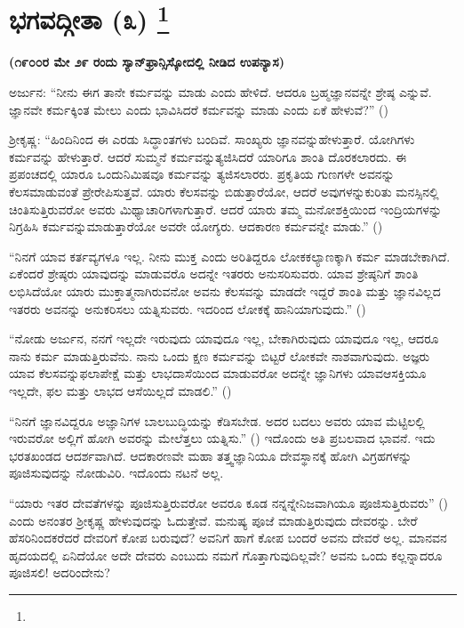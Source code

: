 
\chapter[ಭಗವದ್ಗೀತಾ (೩) ]{ಭಗವದ್ಗೀತಾ (೩) \protect\footnote{}}

\centerline{\textbf{(೧೯೦೦ರ ಮೇ ೨೯ ರಂದು ಸ್ಯಾನ್​ಫ್ರಾನ್ಸಿಸ್ಕೋದಲ್ಲಿ ನೀಡಿದ ಉಪನ್ಯಾಸ)}}

ಅರ್ಜುನ: “ನೀನು ಈಗ ತಾನೇ ಕರ್ಮವನ್ನು ಮಾಡು ಎಂದು ಹೇಳಿದೆ. ಆದರೂ ಬ್ರಹ್ಮಜ್ಞಾನವನ್ನೇ ಶ್ರೇಷ್ಠ ಎನ್ನುವೆ. ಜ್ಞಾನವೇ ಕರ್ಮಕ್ಕಿಂತ ಮೇಲು ಎಂದು ಭಾವಿಸಿದರೆ ಕರ್ಮವನ್ನು ಮಾಡು ಎಂದು ಏಕೆ ಹೇಳುವೆ?” ()

ಶ‍್ರೀಕೃಷ್ಣ: “ಹಿಂದಿನಿಂದ ಈ ಎರಡು ಸಿದ್ಧಾಂತಗಳು ಬಂದಿವೆ. ಸಾಂಖ್ಯರು ಜ್ಞಾನವನ್ನು\break ಹೇಳುತ್ತಾರೆ. ಯೋಗಿಗಳು ಕರ್ಮವನ್ನು ಹೇಳುತ್ತಾರೆ. ಆದರೆ ಸುಮ್ಮನೆ ಕರ್ಮವನ್ನು\break ತ್ಯಜಿಸಿದರೆ ಯಾರಿಗೂ ಶಾಂತಿ ದೊರಕಲಾರದು. ಈ ಪ್ರಪಂಚದಲ್ಲಿ ಯಾರೂ ಒಂದು\break ನಿಮಿಷವೂ ಕರ್ಮವನ್ನು ತ್ಯಜಿಸಲಾರರು. ಪ್ರಕೃತಿಯ ಗುಣಗಳೇ ಅವನನ್ನು ಕೆಲಸ\break ಮಾಡುವಂತೆ ಪ್ರೇರೇಪಿಸುತ್ತವೆ. ಯಾರು ಕೆಲಸವನ್ನು ಬಿಡುತ್ತಾರೆಯೋ, ಆದರೆ ಅವುಗಳನ್ನು\break ಕುರಿತು ಮನಸ್ಸಿನಲ್ಲಿ ಚಿಂತಿಸುತ್ತಿರುವರೋ ಅವರು ಮಿಥ್ಯಾಚಾರಿಗಳಾಗುತ್ತಾರೆ. ಆದರೆ ಯಾರು ತಮ್ಮ ಮನೋಶಕ್ತಿಯಿಂದ ಇಂದ್ರಿಯಗಳನ್ನು ನಿಗ್ರಹಿಸಿ ಕರ್ಮವನ್ನು\break ಮಾಡುತ್ತಾರೆಯೋ ಅವರೇ ಯೋಗ್ಯರು. ಆದಕಾರಣ ಕರ್ಮವನ್ನೇ ಮಾಡು.” ()

“ನಿನಗೆ ಯಾವ ಕರ್ತವ್ಯಗಳೂ ಇಲ್ಲ. ನೀನು ಮುಕ್ತ ಎಂದು ಅರಿತಿದ್ದರೂ ಲೋಕಕಲ್ಯಾಣಕ್ಕಾಗಿ ಕರ್ಮ ಮಾಡಬೇಕಾಗಿದೆ. ಏಕೆಂದರೆ ಶ್ರೇಷ್ಠರು ಯಾವುದನ್ನು ಮಾಡುವರೊ ಅದನ್ನೇ ಇತರರು ಅನುಸರಿಸುವರು. ಯಾವ ಶ್ರೇಷ್ಠನಿಗೆ ಶಾಂತಿ ಲಭಿಸಿದೆಯೋ ಯಾರು ಮುಕ್ತಾತ್ಮನಾಗಿರುವನೋ ಅವನು ಕೆಲಸವನ್ನು ಮಾಡದೇ ಇದ್ದರೆ ಶಾಂತಿ ಮತ್ತು ಜ್ಞಾನವಿಲ್ಲದ ಇತರರು ಅವನನ್ನು ಅನುಕರಿಸಲು ಯತ್ನಿಸುವರು. ಇದರಿಂದ ಲೋಕಕ್ಕೆ ಹಾನಿಯಾಗುವುದು.” ()

“ನೋಡು ಅರ್ಜುನ, ನನಗೆ ಇಲ್ಲದೇ ಇರುವುದು ಯಾವುದೂ ಇಲ್ಲ, ಬೇಕಾಗಿರುವುದು ಯಾವುದೂ ಇಲ್ಲ, ಆದರೂ ನಾನು ಕರ್ಮ ಮಾಡುತ್ತಿರುವೆನು. ನಾನು ಒಂದು ಕ್ಷಣ ಕರ್ಮವನ್ನು ಬಿಟ್ಟರೆ ಲೋಕವೇ ನಾಶವಾಗುವುದು. ಅಜ್ಞರು ಯಾವ ಕೆಲಸವನ್ನು\break ಫಲಾಪೇಕ್ಷೆ ಮತ್ತು ಲಾಭದಾಸೆಯಿಂದ ಮಾಡುವರೋ ಅದನ್ನೇ ಜ್ಞಾನಿಗಳು ಯಾವ\break ಆಸಕ್ತಿಯೂ ಇಲ್ಲದೇ, ಫಲ ಮತ್ತು ಲಾಭದ ಆಸೆಯಿಲ್ಲದೆ ಮಾಡಲಿ.” ()

“ನಿನಗೆ ಜ್ಞಾನವಿದ್ದರೂ ಅಜ್ಞಾನಿಗಳ ಬಾಲಬುದ್ಧಿಯನ್ನು ಕೆಡಿಸಬೇಡ. ಅದರ ಬದಲು ಅವರು ಯಾವ ಮೆಟ್ಟಿಲಲ್ಲಿ ಇರುವರೋ ಅಲ್ಲಿಗೆ ಹೋಗಿ ಅವರನ್ನು ಮೇಲೆತ್ತಲು ಯತ್ನಿಸು.” () ಇದೊಂದು ಅತಿ ಪ್ರಬಲವಾದ ಭಾವನೆ. ಇದು ಭರತಖಂಡದ ಆದರ್ಶವಾಗಿದೆ. ಆದಕಾರಣವೇ ಮಹಾ ತತ್ತ್ವಜ್ಞಾನಿಯೂ ದೇವಸ್ಥಾನಕ್ಕೆ ಹೋಗಿ ವಿಗ್ರಹಗಳನ್ನು ಪೂಜಿಸುವುದನ್ನು ನೋಡುವಿರಿ. ಇದೊಂದು ನಟನೆ ಅಲ್ಲ.

“ಯಾರು ಇತರ ದೇವತೆಗಳನ್ನು ಪೂಜಿಸುತ್ತಿರುವರೋ ಅವರೂ ಕೂಡ ನನ್ನನ್ನೇ\break ನಿಜವಾಗಿಯೂ ಪೂಜಿಸುತ್ತಿರುವರು” () ಎಂದು ಅನಂತರ ಶ‍್ರೀಕೃಷ್ಣ ಹೇಳುವುದನ್ನು ಓದುತ್ತೇವೆ. ಮನುಷ್ಯ ಪೂಜೆ ಮಾಡುತ್ತಿರುವುದು ದೇವರನ್ನು. ಬೇರೆ ಹೆಸರಿನಿಂದ\break ಕರೆದರೆ ದೇವರಿಗೆ ಕೋಪ ಬರುವುದೆ? ಅವನಿಗೆ ಹಾಗೆ ಕೋಪ ಬಂದರೆ ಅವನು ದೇವರೆ ಅಲ್ಲ. ಮಾನವನ ಹೃದಯದಲ್ಲಿ ಏನಿದೆಯೋ ಅದೇ ದೇವರು ಎಂಬುದು ನಮಗೆ ಗೊತ್ತಾಗುವುದಿಲ್ಲವೇ? ಅವನು ಒಂದು ಕಲ್ಲನ್ನಾದರೂ ಪೂಜಿಸಲಿ! ಅದರಿಂದೇನು?

